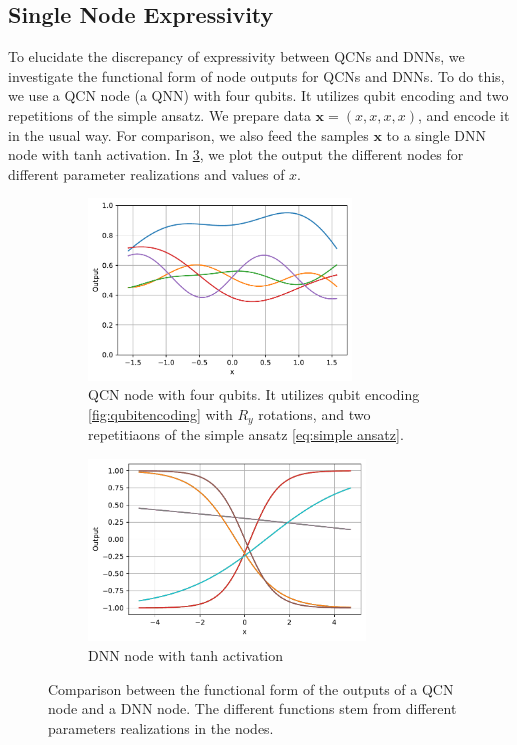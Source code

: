 \subsection{Single Node Expressivity}\label{sec:Single Node Expressivity}
To elucidate the discrepancy of expressivity between QCNs and DNNs, we investigate the functional form of node outputs for QCNs and DNNs. To do this, we use a QCN node (a QNN) with four qubits. It utilizes qubit encoding and two repetitions of the simple ansatz. We prepare data $\boldsymbol{x} = (x, x, x, x)$, and encode it in the usual way. For comparison, we also feed the samples $\boldsymbol{x}$ to a single DNN node with tanh activation. In \cref{fig:activations}, we plot the output the different nodes for different parameter realizations and values of $x$.

\begin{figure}[H]
    \centering
    \begin{subfigure}[t]{0.5\textwidth}
        \centering
        \includegraphics[height=1.9in]{latex/figures/activation_qnn_4.pdf}
        \caption{QCN node with four qubits. It utilizes qubit encoding \cref{fig:qubitencoding} with $R_y$ rotations, and two repetitiaons of the simple ansatz \cref{eq:simple ansatz}.}
        \label{fig:activations tensorial}
    \end{subfigure}%
    \hfill 
    \begin{subfigure}[t]{0.5\textwidth}
        \centering
        \includegraphics[height=1.9in]{latex/figures/activation_dnn.pdf}
        \caption{DNN node with tanh activation}
        \label{fig:activations DNN}
    \end{subfigure}%
    \caption{Comparison between the functional form of the outputs of a QCN node and a DNN node. The different functions stem from different parameters realizations in the nodes.}
    \label{fig:activations}
\end{figure}

